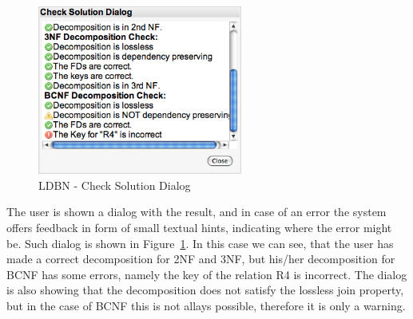 \begin{figure}[h]
	\begin{center}
		\includegraphics[width=0.6\textwidth]{./img/screen03.png}
		\caption{LDBN - Check Solution Dialog}
		\label{fig:screen03}
	\end{center}
\end{figure}

The user is shown a dialog with the result, and in case of an error the system offers
feedback in form of small textual hints, indicating
where the error might be. Such dialog is shown in Figure~\ref{fig:screen03}. In this case
we can see, that the user has made a correct decomposition for 2NF and 3NF,
but his/her decomposition for BCNF has some errors, namely the key of the relation R4 is
incorrect. The dialog is also showing that the decomposition does not 
satisfy the lossless join property, but in the case of BCNF this
is not allays possible, therefore it is only a warning. 

